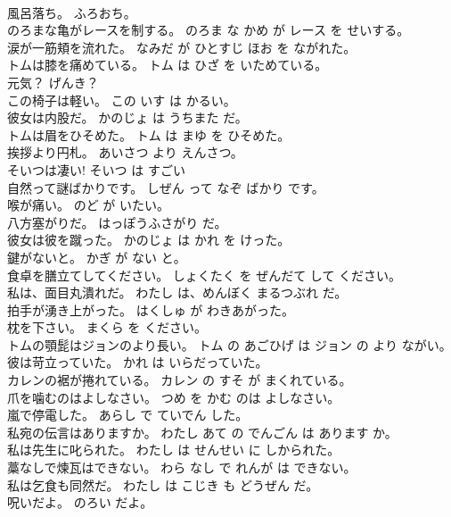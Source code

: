 \documentclass[8pt]{extreport}
\begin{document}
\begin{CJK}{UTF8}{min}
\\	風呂落ち。	ふろおち。	
\\	のろまな亀がレースを制する。	のろま な かめ が レース を せいする。	
\\	涙が一筋頬を流れた。	なみだ が ひとすじ ほお を ながれた。	
\\	トムは膝を痛めている。	トム は ひざ を いためている。	
\\	元気？	げんき？	
\\	この椅子は軽い。	この いす は かるい。	
\\	彼女は内股だ。	かのじょ は うちまた だ。	
\\	トムは眉をひそめた。	トム は まゆ を ひそめた。	
\\	挨拶より円札。	あいさつ より えんさつ。	
\\	そいつは凄い!	そいつ は すごい 
\\	自然って謎ばかりです。	しぜん って なぞ ばかり です。	
\\	喉が痛い。	のど が いたい。	
\\	八方塞がりだ。	はっぽうふさがり だ。	
\\	彼女は彼を蹴った。	かのじょ は かれ を けった。	
\\	鍵がないと。	かぎ が ない と。	
\\	食卓を膳立てしてください。	しょくたく を ぜんだて して ください。	
\\	私は、面目丸潰れだ。	わたし は、めんぼく まるつぶれ だ。	
\\	拍手が湧き上がった。	はくしゅ が わきあがった。	
\\	枕を下さい。	まくら を ください。	
\\	トムの顎髭はジョンのより長い。	トム の あごひげ は ジョン の より ながい。	
\\	彼は苛立っていた。	かれ は いらだっていた。	
\\	カレンの裾が捲れている。	カレン の すそ が まくれている。	
\\	爪を噛むのはよしなさい。	つめ を かむ のは よしなさい。	
\\	嵐で停電した。	あらし で ていでん した。	
\\	私宛の伝言はありますか。	わたし あて の でんごん は あります か。	
\\	私は先生に叱られた。	わたし は せんせい に しかられた。	
\\	藁なしで煉瓦はできない。	わら なし で れんが は できない。	
\\	私は乞食も同然だ。	わたし は こじき も どうぜん だ。	
\\	呪いだよ。	のろい だよ。	

\end{CJK}
\end{document}
